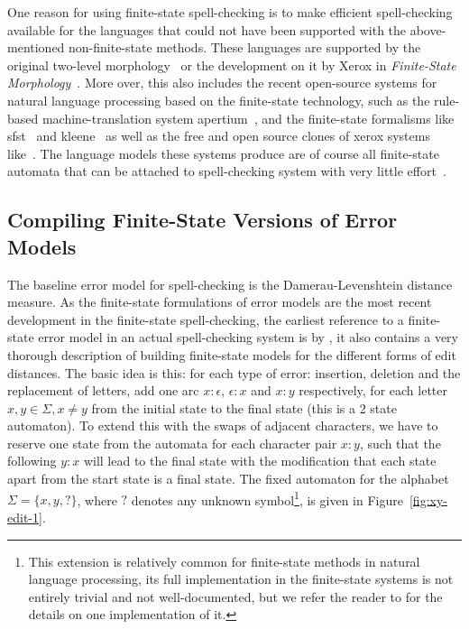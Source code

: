 \documentclass[a4paper,12pt]{article}
\begin{document}
One reason for using finite-state spell-checking is to make efficient
spell-checking available for the languages that could not have been supported
with the above-mentioned non-finite-state methods. These languages are
supported by the original two-level morphology~\cite[]{koskenniemi/1983} or the
development on it by Xerox in \emph{Finite-State
Morphology}~\cite[]{beesley2003finite}.  More over, this also includes the
recent open-source systems for natural language processing based on the
finite-state technology, such as the rule-based machine-translation system
apertium~\cite[]{apertium2010}, and the finite-state formalisms like
sfst~\cite[]{schmid2006programming} and kleene~\cite[]{beesley2012kleene} as
well as the free and open source clones of xerox systems
like~\cite{hfst/2012/cla,hulden2009foma}.  The language models these systems
produce are of course all finite-state automata that can be attached to
spell-checking system with very little
effort~\cite[e.g.][]{pirinen2012compiling}.

\subsection{Compiling Finite-State Versions of Error Models}
\label{subsec:error-models}

The baseline error model for spell-checking is the Damerau-Levenshtein distance
measure. As the finite-state formulations of error models are the most recent
development in the finite-state spell-checking, the earliest reference to a
finite-state error model in an actual spell-checking system is by
\cite{schulz/2002}, it also contains a very thorough description of building
finite-state models for the different forms of edit distances. The basic
idea is this: for each type of error: insertion, deletion and the replacement
of
letters, add one arc $x:\epsilon$, $\epsilon:x$ and $x:y$ respectively, for
each letter $x, y \in \Sigma, x \neq y$ from the initial state to the final
state (this is a 2 state automaton). To extend this with the swaps of adjacent
characters, we have to reserve one state from the automata for each character
pair $x:y$, such that the following $y:x$ will lead to the final state
\cite[]{pirinen/2010/lrec} with the modification that each state apart
from the start state is a final state.  The fixed automaton for the alphabet
$\Sigma = \{x, y, ?\}$, where $?$ denotes any unknown symbol\footnote{This
    extension is relatively common for finite-state methods in natural language
processing, its full implementation in the finite-state systems is not entirely
trivial and not well-documented, but we refer the reader to
\cite[]{beesley2003finite} for the details on one implementation of it.}, is
given in Figure~\ref{fig:xy-edit-1}.
\end{document}
